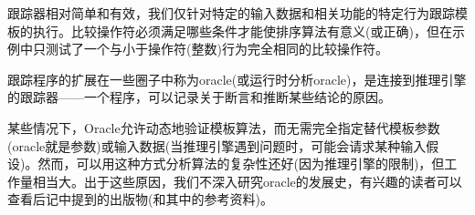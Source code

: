 跟踪器相对简单和有效，我们仅针对特定的输入数据和相关功能的特定行为跟踪模板的执行。比较操作符必须满足哪些条件才能使排序算法有意义(或正确)，但在示例中只测试了一个与小于操作符(整数)行为完全相同的比较操作符。

跟踪程序的扩展在一些圈子中称为oracle(或运行时分析oracle)，是连接到推理引擎的跟踪器——一个程序，可以记录关于断言和推断某些结论的原因。

某些情况下，Oracle允许动态地验证模板算法，而无需完全指定替代模板参数(oracle就是参数)或输入数据(当推理引擎遇到问题时，可能会请求某种输入假设)。然而，可以用这种方式分析算法的复杂性还好(因为推理引擎的限制)，但工作量相当大。出于这些原因，我们不深入研究oracle的发展史，有兴趣的读者可以查看后记中提到的出版物(和其中的参考资料)。